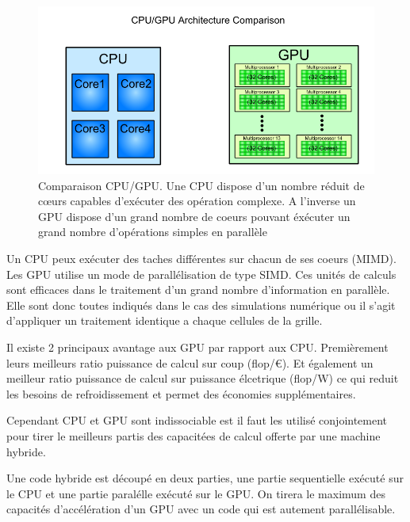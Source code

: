 \begin{figure}[bth]
        \includegraphics[width=.95\linewidth]{img/02/cpu_vs_gpu.png} 
        \caption{Comparaison CPU/GPU. Une CPU dispose d'un nombre réduit de cœurs capables d’exécuter des opération complexe. A l'inverse un GPU dispose d'un grand nombre de coeurs pouvant éxécuter un grand nombre d'opérations simples en parallèle}
 		\label{fig:cpugpu}
\end{figure}


Un CPU peux exécuter des taches différentes sur chacun de ses coeurs (MIMD).
Les GPU utilise un mode de parallélisation de type SIMD.
Ces unités de calculs sont  efficaces dans le traitement d'un grand nombre d'information en parallèle.
Elle sont donc toutes indiqués dans le cas des simulations numérique ou il s'agit d'appliquer un traitement identique a chaque cellules de la grille.

Il existe 2 principaux avantage aux GPU par rapport aux CPU.
Premièrement leurs meilleurs ratio puissance de calcul sur coup (flop/€).
Et également un meilleur ratio puissance de calcul sur puissance élcetrique (flop/W) ce qui reduit les besoins de refroidissement et permet des économies supplémentaires.


%
%
%
%
%

 

Cependant CPU et GPU sont indissociable est il faut les utilisé conjointement pour tirer le meilleurs partis des capacitées de calcul offerte par une machine hybride.

Une code hybride est découpé en deux parties, une partie sequentielle exécuté sur le CPU et une partie paralélle exécuté sur le GPU.
On tirera le maximum des capacités d'accélération d'un GPU avec un code qui est autement parallélisable.



